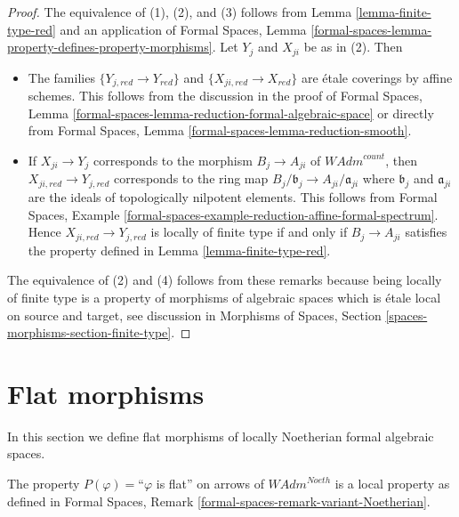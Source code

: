 \begin{proof}
The equivalence of (1), (2), and (3) follows from
Lemma \ref{lemma-finite-type-red} and an application of
Formal Spaces, Lemma
\ref{formal-spaces-lemma-property-defines-property-morphisms}.
Let $Y_j$ and $X_{ji}$ be as in (2). Then
\begin{itemize}
\item The families $\{Y_{j, red} \to Y_{red}\}$ and
$\{X_{ji, red} \to X_{red}\}$ are \'etale coverings by affine schemes.
This follows from the discussion in the proof of
Formal Spaces, Lemma
\ref{formal-spaces-lemma-reduction-formal-algebraic-space}
or directly from
Formal Spaces, Lemma \ref{formal-spaces-lemma-reduction-smooth}.
\item If $X_{ji} \to Y_j$ corresponds to the morphism
$B_j \to A_{ji}$ of $\textit{WAdm}^{count}$, then
$X_{ji, red} \to Y_{j, red}$ corresponds to the ring map
$B_j/\mathfrak b_j \to A_{ji}/\mathfrak a_{ji}$ where
$\mathfrak b_j$ and $\mathfrak a_{ji}$ are the ideals of
topologically nilpotent elements. This follows from
Formal Spaces, Example
\ref{formal-spaces-example-reduction-affine-formal-spectrum}.
Hence $X_{ji, red} \to Y_{j, red}$ is locally of finite type
if and only if $B_j \to A_{ji}$ satisfies the
property defined in Lemma \ref{lemma-finite-type-red}.
\end{itemize}
The equivalence of (2) and (4) follows from these remarks because
being locally of finite type is a property of morphisms of algebraic
spaces which is \'etale local on source and target, see discussion in
Morphisms of Spaces, Section \ref{spaces-morphisms-section-finite-type}.
\end{proof}


















\section{Flat morphisms}
\label{section-flat}

\noindent
In this section we define flat morphisms of locally Noetherian formal
algebraic spaces.

\begin{lemma}
\label{lemma-flat-axioms}
The property $P(\varphi)=$``$\varphi$ is flat'' on arrows
of $\textit{WAdm}^{Noeth}$ is a local property as defined in
Formal Spaces, Remark \ref{formal-spaces-remark-variant-Noetherian}.
\end{lemma}

